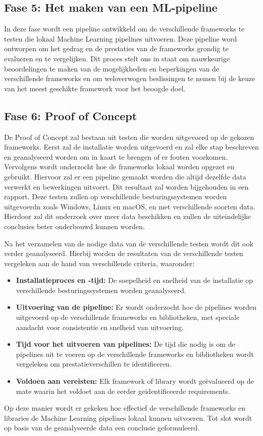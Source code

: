 \subsection{Fase 5: Het maken van een ML-pipeline}
In deze fase wordt een pipeline ontwikkeld om de verschillende frameworks te testen die lokaal Machine Learning pipelines uitvoeren. Deze pipeline word ontworpen om het gedrag en de prestaties van de frameworks grondig te evalueren en te vergelijken. Dit proces stelt ons in staat om nauwkeurige beoordelingen te maken van de mogelijkheden en beperkingen van de verschillende frameworks en om weloverwogen beslissingen te nemen bij de keuze van het meest geschikte framework voor het beoogde doel.
\subsection{Fase 6: Proof of Concept}
De Proof of Concept zal bestaan uit testen die worden uitgevoerd op de gekozen frameworks. Eerst zal de installatie worden uitgevoerd en zal elke stap beschreven en geanalyseerd worden om in kaart te brengen of er fouten voorkomen. Vervolgens wordt onderzocht hoe de frameworks lokaal worden opgezet en gebruikt. Hiervoor zal er een pipeline gemaakt worden die altijd dezelfde data verwerkt en bewerkingen uitvoert. Dit resultaat zal worden bijgehouden in een rapport.
Deze testen zullen op verschillende besturingssystemen worden uitgevoerdn zoals Windows, Linux en macOS, en met verschillende soorten data. Hierdoor zal dit onderzoek over meer data beschikken en zullen de uiteindelijke conclusies beter onderbouwd kunnen worden.

Na het verzamelen van de nodige data van de verschillende testen wordt dit ook verder geanalyseerd. Hierbij worden de resultaten van de verschillende testen vergeleken aan de hand van verschillende criteria, waaronder:
\begin{itemize}
  \item \textbf{Installatieproces en -tijd:} De soepelheid en snelheid van de installatie op verschillende besturingssystemen worden geanalyseerd.
  \item \textbf{Uitvoering van de pipeline:} Er wordt onderzocht hoe de pipelines worden uitgevoerd op de verschillende frameworks en bibliotheken, met speciale aandacht voor consistentie en snelheid van uitvoering.
  \item \textbf{Tijd voor het uitvoeren van pipelines:} De tijd die nodig is om de pipelines uit te voeren op de verschillende frameworks en bibliotheken wordt vergeleken om prestatieverschillen te identificeren.
  \item \textbf{Voldoen aan vereisten:} Elk framework of library wordt geëvalueerd op de mate waarin het voldoet aan de eerder geïdentificeerde requirements.
\end{itemize}
Op deze manier wordt er gekeken hoe effectief de verschillende frameworks en libraries de Machine Learning pipelines lokaal kunnen uitvoeren. Tot slot wordt op basis van de geanalyseerde data een conclusie geformuleerd.\\
